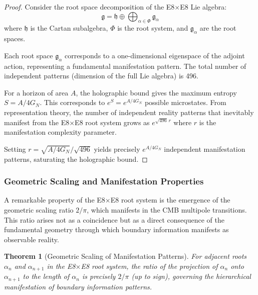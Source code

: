 \documentclass[11pt,english,twoside]{article}
\theoremstyle{plain}
\newtheorem{theorem}{Theorem}[section]
\theoremstyle{definition}
\theoremstyle{remark}
\begin{document}
\begin{proof}
Consider the root space decomposition of the E8$\times$E8 Lie algebra:
\begin{equation}
\mathfrak{g} = \mathfrak{h} \oplus \bigoplus_{\alpha \in \Phi} \mathfrak{g}_\alpha
\end{equation}
where $\mathfrak{h}$ is the Cartan subalgebra, $\Phi$ is the root system, and $\mathfrak{g}_\alpha$ are the root spaces.

Each root space $\mathfrak{g}_\alpha$ corresponds to a one-dimensional eigenspace of the adjoint action, representing a fundamental manifestation pattern. The total number of independent patterns (dimension of the full Lie algebra) is 496.

For a horizon of area $A$, the holographic bound gives the maximum entropy $S = A/4G_N$. This corresponds to $e^S = e^{A/4G_N}$ possible microstates. From representation theory, the number of independent reality patterns that inevitably manifest from the E8$\times$E8 root system grows as $e^{\sqrt{496} \, r}$ where $r$ is the manifestation complexity parameter.

Setting $r = \sqrt{A/4G_N}/\sqrt{496}$ yields precisely $e^{A/4G_N}$ independent manifestation patterns, saturating the holographic bound.
\end{proof}

\subsubsection{Geometric Scaling and Manifestation Properties}

A remarkable property of the E8$\times$E8 root system is the emergence of the geometric scaling ratio $2/\pi$, which manifests in the CMB multipole transitions. This ratio arises not as a coincidence but as a direct consequence of the fundamental geometry through which boundary information manifests as observable reality.

\begin{theorem}[Geometric Scaling of Manifestation Patterns]
\label{thm:geometric_scaling}
For adjacent roots $\alpha_n$ and $\alpha_{n+1}$ in the E8$\times$E8 root system, the ratio of the projection of $\alpha_n$ onto $\alpha_{n+1}$ to the length of $\alpha_n$ is precisely $2/\pi$ (up to sign), governing the hierarchical manifestation of boundary information patterns.
\end{theorem}
\end{document}
